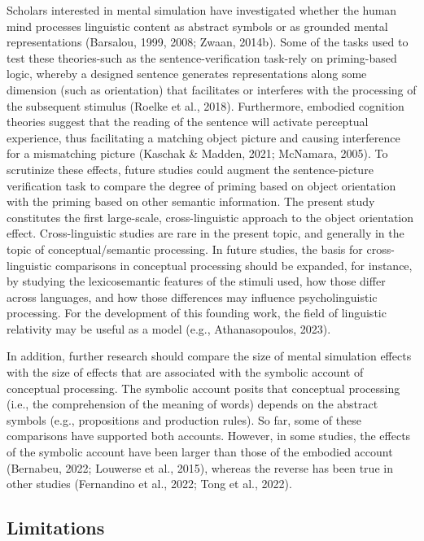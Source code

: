 \documentclass[
  man,mask,floatsintext]{apa7}
\begin{document}
Scholars interested in mental simulation have investigated whether the
human mind processes linguistic content as abstract symbols or as
grounded mental representations (Barsalou, 1999, 2008; Zwaan, 2014b).
Some of the tasks used to test these theories-such as the
sentence-verification task-rely on priming-based logic, whereby a
designed sentence generates representations along some dimension (such
as orientation) that facilitates or interferes with the processing of
the subsequent stimulus (Roelke et al., 2018). Furthermore, embodied cognition
theories suggest that the reading of the sentence will activate
perceptual experience, thus facilitating a matching object picture and
causing interference for a mismatching picture
(Kaschak \& Madden, 2021; McNamara, 2005). To scrutinize these effects,
future studies could augment the sentence-picture verification task to
compare the degree of priming based on object orientation with the
priming based on other semantic information. The present study
constitutes the first large-scale, cross-linguistic approach to the
object orientation effect. Cross-linguistic studies are rare in the
present topic, and generally in the topic of conceptual/semantic
processing. In future studies, the basis for cross-linguistic
comparisons in conceptual processing should be expanded, for instance,
by studying the lexicosemantic features of the stimuli used, how those
differ across languages, and how those differences may influence
psycholinguistic processing. For the development of this founding work,
the field of linguistic relativity may be useful as a model (e.g., Athanasopoulos, 2023).

In addition, further research should compare the size of mental
simulation effects with the size of effects that are associated with the
symbolic account of conceptual processing. The symbolic account posits
that conceptual processing (i.e., the comprehension of the meaning of
words) depends on the abstract symbols (e.g., propositions and
production rules). So far, some of these comparisons have supported both
accounts. However, in some studies, the effects of the symbolic account
have been larger than those of the embodied account (Bernabeu, 2022; Louwerse et al., 2015), whereas the reverse has been true in other studies
(Fernandino et al., 2022; Tong et al., 2022).

\hypertarget{limitations}{%
\subsection{Limitations}\label{limitations}}
\end{document}
